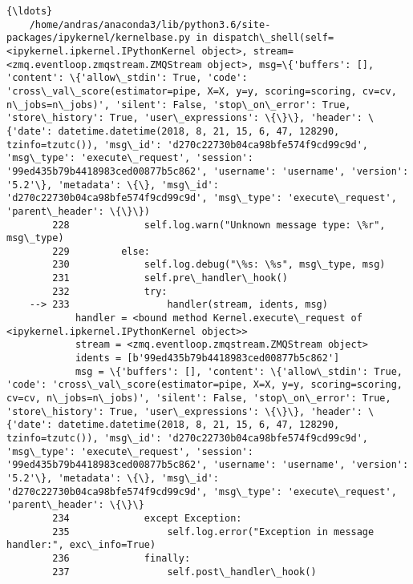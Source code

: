 \documentclass[11pt]{article}
\begin{document}
\begin{Verbatim}[commandchars=\\\{\}]
    {\ldots}
    /home/andras/anaconda3/lib/python3.6/site-packages/ipykernel/kernelbase.py in dispatch\_shell(self=<ipykernel.ipkernel.IPythonKernel object>, stream=<zmq.eventloop.zmqstream.ZMQStream object>, msg=\{'buffers': [], 'content': \{'allow\_stdin': True, 'code': 'cross\_val\_score(estimator=pipe, X=X, y=y, scoring=scoring, cv=cv, n\_jobs=n\_jobs)', 'silent': False, 'stop\_on\_error': True, 'store\_history': True, 'user\_expressions': \{\}\}, 'header': \{'date': datetime.datetime(2018, 8, 21, 15, 6, 47, 128290, tzinfo=tzutc()), 'msg\_id': 'd270c22730b04ca98bfe574f9cd99c9d', 'msg\_type': 'execute\_request', 'session': '99ed435b79b4418983ced00877b5c862', 'username': 'username', 'version': '5.2'\}, 'metadata': \{\}, 'msg\_id': 'd270c22730b04ca98bfe574f9cd99c9d', 'msg\_type': 'execute\_request', 'parent\_header': \{\}\})
        228             self.log.warn("Unknown message type: \%r", msg\_type)
        229         else:
        230             self.log.debug("\%s: \%s", msg\_type, msg)
        231             self.pre\_handler\_hook()
        232             try:
    --> 233                 handler(stream, idents, msg)
            handler = <bound method Kernel.execute\_request of <ipykernel.ipkernel.IPythonKernel object>>
            stream = <zmq.eventloop.zmqstream.ZMQStream object>
            idents = [b'99ed435b79b4418983ced00877b5c862']
            msg = \{'buffers': [], 'content': \{'allow\_stdin': True, 'code': 'cross\_val\_score(estimator=pipe, X=X, y=y, scoring=scoring, cv=cv, n\_jobs=n\_jobs)', 'silent': False, 'stop\_on\_error': True, 'store\_history': True, 'user\_expressions': \{\}\}, 'header': \{'date': datetime.datetime(2018, 8, 21, 15, 6, 47, 128290, tzinfo=tzutc()), 'msg\_id': 'd270c22730b04ca98bfe574f9cd99c9d', 'msg\_type': 'execute\_request', 'session': '99ed435b79b4418983ced00877b5c862', 'username': 'username', 'version': '5.2'\}, 'metadata': \{\}, 'msg\_id': 'd270c22730b04ca98bfe574f9cd99c9d', 'msg\_type': 'execute\_request', 'parent\_header': \{\}\}
        234             except Exception:
        235                 self.log.error("Exception in message handler:", exc\_info=True)
        236             finally:
        237                 self.post\_handler\_hook()
    

\end{Verbatim}
\end{document}
